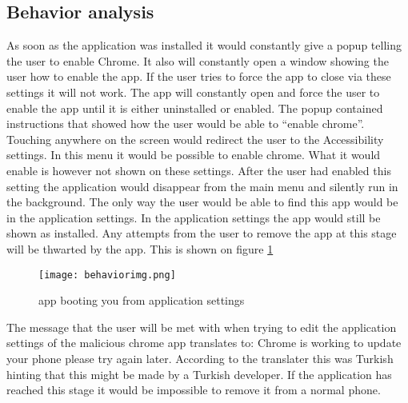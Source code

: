 \subsection{Behavior analysis}

As soon as the application was installed it would constantly give a popup telling the user to enable Chrome. 
It also will constantly open a window showing the user how to enable the app. 
If the user tries to force the app to close via these settings it will not work. 
The app will constantly open and force the user to enable the app until it is either uninstalled or enabled.
The popup contained instructions that showed how the user would be able to “enable chrome”. 
Touching anywhere on the screen would redirect the user to the Accessibility settings. 
In this menu it would be possible to enable chrome. What it would enable is however not shown on these settings. 
After the user had enabled this setting the application would disappear from the main menu and silently run in the background. 
The only way the user would be able to find this app would be in the application settings. 
In the application settings the app would still be shown as installed. 
Any attempts from the user to remove the app at this stage will be thwarted by the app.
This is shown on figure \ref{tim-appbehavior}

\begin{figure}[H]
    \centering
    \texttt{[image: behaviorimg.png]}
    \caption{app booting you from application settings}
    \label{tim-appbehavior}
\end{figure}

The message that the user will be met with when trying to edit the application settings of the malicious chrome app translates to: 
Chrome is working to update your phone please try again later.
According to the translater this was Turkish hinting that this might be made by a Turkish developer.
If the application has reached this stage it would be impossible to remove it from a normal phone.
